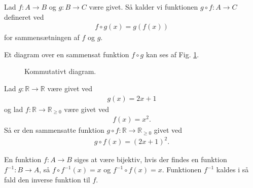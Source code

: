 \begin{defn}
	Lad $f:A \to B$ og $g:B \to C$ være givet. Så kalder vi funktionen $g\circ f:A \to C$ 			defineret ved
	\begin{align*}
		f\circ g(x) = g(f(x))
	\end{align*}
	for sammensætningen af $f$ og $g$. 
\end{defn}

Et diagram over en sammensat funktion $f\circ g$ kan ses af Fig. \ref{fig:komdiag}.
\begin{figure}[H]
	\centering
	\caption{Kommutativt diagram.}
	\label{fig:komdiag}
\end{figure}
\begin{exa}
	Lad $g: \mathbb{R} \to \mathbb{R}$ være givet ved
	\begin{align*}
		g(x) = 2x+1
	\end{align*}
	og lad $f:\mathbb{R} \to \mathbb{R}_{\geq 0}$ være givet ved
	\begin{align*}
		f(x) = x^2.
	\end{align*}
	Så er den sammensatte funktion $g \circ f: \mathbb{R} \to \mathbb{R}_{\geq 0}$ givet ved
	\begin{align*}
		g\circ f (x) = (2x+1)^2.
	\end{align*}
\end{exa}
\begin{defn}
	En funktion $f: A \to B$ siges at være bijektiv, hvis der findes en 
	funktion $f^{-1}: B \to A$, så $f\circ f^{-1}(x) = x$ og $f^{-1} \circ f(x) = x$. 
	Funktionen $f^{-1}$ kaldes i så fald den inverse funktion til $f$.
\end{defn}

